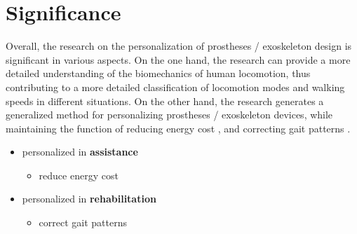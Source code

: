 \documentclass{article}
\begin{document}
\section{Significance}
\noindent Overall, the research on the personalization of prostheses / exoskeleton design is significant in various aspects. On the one hand, the research can provide a more detailed understanding of the biomechanics of human locomotion, thus contributing to a more detailed classification of locomotion modes and walking speeds in different situations. On the other hand, the research generates a generalized method for personalizing prostheses / exoskeleton devices, while maintaining the function of reducing energy cost \cite{ReduceEnergyCost}, and correcting gait patterns \cite{GaitCorrection}.

\begin{itemize}
    \item personalized in \textbf{assistance}
    \begin{itemize}
        \item reduce energy cost \cite{ReduceEnergyCost}
    \end{itemize}
    \item personalized in \textbf{rehabilitation}
    \begin{itemize}
        \item correct gait patterns \cite{GaitCorrection}
    \end{itemize}
\end{itemize}



\end{document}
